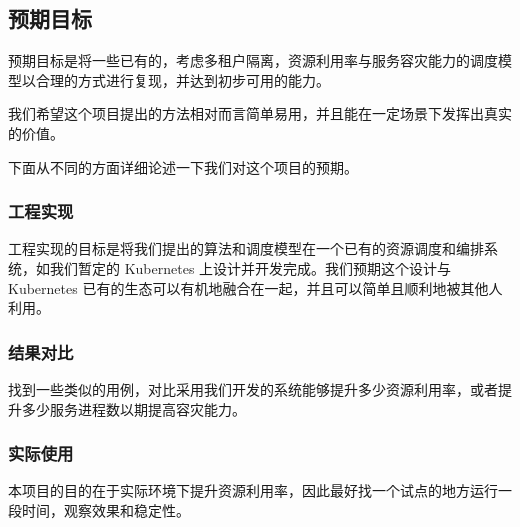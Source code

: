 \subsection{预期目标}

预期目标是将一些已有的，考虑多租户隔离，资源利用率与服务容灾能力的调度模型以合理的方式进行复现，并达到初步可用的能力。

我们希望这个项目提出的方法相对而言简单易用，并且能在一定场景下发挥出真实的价值。

下面从不同的方面详细论述一下我们对这个项目的预期。

\subsubsection{工程实现}

工程实现的目标是将我们提出的算法和调度模型在一个已有的资源调度和编排系统，如我们暂定的 Kubernetes 上设计并开发完成。我们预期这个设计与 Kubernetes 已有的生态可以有机地融合在一起，并且可以简单且顺利地被其他人利用。

\subsubsection{结果对比}

找到一些类似的用例，对比采用我们开发的系统能够提升多少资源利用率，或者提升多少服务进程数以期提高容灾能力。

\subsubsection{实际使用}

本项目的目的在于实际环境下提升资源利用率，因此最好找一个试点的地方运行一段时间，观察效果和稳定性。